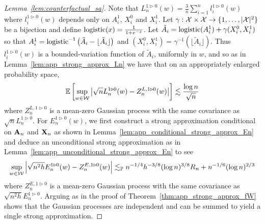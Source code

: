 \begin{proof}[Lemma~\ref{lem:counterfactual_sa}]

  Note that
  $L_n^{1 \triangleright 0}(w)
  = \frac 3n \sum_{i=1}^n l_i^{1 \triangleright 0}(w)$
  where $l_i^{1 \triangleright 0}(w)$ depends only on
  $A_i^1$, $X_i^0$ and $X_i^1$.
  Let $\gamma: \mathcal{X} \times \mathcal{X} \to \{1, \ldots, |\mathcal{X}|^2\}$
  be a bijection and
  define $\operatorname*{logistic}(x) = \frac{1}{1+e^{-x}}$.
  Let
  $\tilde A_i = \operatorname*{logistic}(A_i^1) + \gamma(X_i^0, X_i^1)$
  so that
  $A_i^1 = \operatorname*{logistic}^{-1}\big(\tilde A_i
  - \lfloor \tilde A_i \rfloor\big)$
  and
  $(X_i^0, X_i^1) = \gamma^{-1}(\lfloor \tilde A_i \rfloor)$.
  Thus
  $l_i^{1 \triangleright 0}(w)$ is a bounded-variation function
  of $\tilde A_i$, uniformly in $w$, and so as in
  Lemma~\ref{lem:app_strong_approx_Ln} we have that
  on an appropriately enlarged probability space,
  \begin{align*}
    \mathbb{E}\left[
      \sup_{w \in \mathcal{W}}
      \left|
      \sqrt n L_n^{1 \triangleright 0}(w)
      - Z_n^{L, 1 \triangleright 0}(w)
      \right|
    \right]
    \lesssim
    \frac{\log n}{\sqrt n}
  \end{align*}
  where $Z_n^{L, 1 \triangleright 0}$ is a mean-zero
  Gaussian process with the same covariance as
  $\sqrt n L_n^{1 \triangleright 0}$.
  For $E_n^{1 \triangleright 0}(w)$,
  we first construct a strong approximation conditional on
  $\mathbf{A}_n$ and $\mathbf{X}_n$ as shown in
  Lemma~\ref{lem:app_conditional_strong_approx_En}
  and deduce an unconditional strong approximation as in
  Lemma~\ref{lem:app_unconditional_strong_approx_En} to see
  \begin{align*}
    \sup_{w \in \mathcal{W}}
    \left|
    \sqrt{n^2h} E_n^{1 \triangleright 0}(w)
    - Z_n^{E, 1 \triangleright 0}(w)
    \right|
    \lesssim_{\mathbb{P}}
    n^{-1/4} h^{-3/8} (\log n)^{3/8} R_n
    + n^{-1/6} (\log n)^{2/3}
  \end{align*}
  where $Z_n^{E, 1 \triangleright 0}$ is a mean-zero
  Gaussian process with the same covariance as
  $\sqrt{n^2h} E_n^{1 \triangleright 0}$.
  Arguing as in the proof of Theorem~\ref{thm:app_strong_approx_fW}
  shows that the Gaussian processes are independent
  and can be summed to yield a single strong approximation.
\end{proof}

